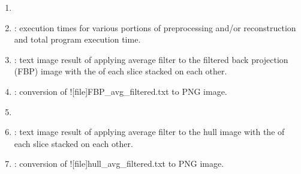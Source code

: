 \begin{tcbenvironment}
\begin{tcbparagraph}
\begin{enumerate}
	\item {}
	\item {} : execution times for various portions of preprocessing and/or reconstruction and total program execution time.
	\item {} : text image result of applying average filter to the filtered back projection (FBP) image with the \xyplane* of each slice stacked on each other.
 	\item {} : conversion of \docentry![file]{FBP\_avg\_filtered.txt} to PNG image.
	\item {}	
	\item {} : text image result of applying average filter to the hull image with the \xyplane* of each slice stacked on each other.
	\item {} : conversion of \docentry![file]{hull\_avg\_filtered.txt} to PNG image.

\end{enumerate}
\end{tcbparagraph}
\end{tcbenvironment}
